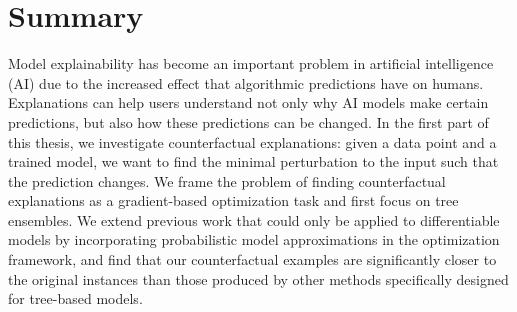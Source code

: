 



\renewcommand{\bibsection}{\chapter*{Bibliography}}
\renewcommand{\bibname}{Bibliography}
\renewcommand{\bibfont}{\footnotesize}
\setlength{\bibsep}{0pt}







\chapter*{Summary}
Model explainability has become an important problem in artificial intelligence (AI) due to the increased effect that algorithmic predictions have on humans. 
Explanations can help users understand not only why AI models make certain predictions, but also how these predictions can be changed. 
In the first part of this thesis, we investigate counterfactual explanations: given a data point and a trained model, we want to find the minimal perturbation to the input such that the prediction changes. 
We frame the problem of finding counterfactual explanations as a gradient-based optimization task and first focus on tree ensembles. 
We extend previous work that could only be applied to differentiable models by incorporating probabilistic model approximations in the optimization framework, and find that our counterfactual examples are significantly closer to the original instances than those produced by other methods specifically designed for tree-based models. 

